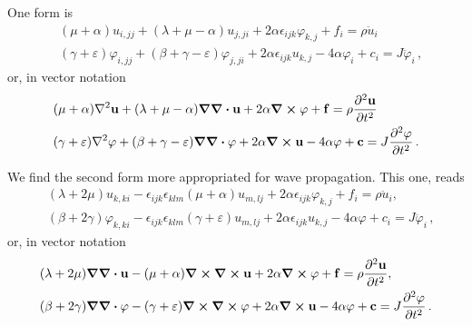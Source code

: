 \documentclass[12pt]{article}
\begin{document}
One form is
\begin{subequations}
  \begin{align}
    & (\mu + \alpha) u_{i, jj} + (\lambda + \mu - \alpha) u_{j,ji} + 2\alpha \epsilon_{ijk}\varphi_{k,j} + f_i = \rho \ddot{u}_i\, \\
    & (\gamma + \varepsilon) \varphi_{i, jj} + (\beta + \gamma - \varepsilon) \varphi_{j,ji} + 2\alpha \epsilon_{ijk}u_{k,j} - 4\alpha \varphi_i  + c_i = J \ddot{\varphi}_i\, ,
  \end{align}
\end{subequations}
or, in vector notation
\begin{align*}
    & (\mu + \alpha)\laplacian{\vb{u}} + (\lambda + \mu - \alpha) \grad\div\vb{u} + 2\alpha \curl\vb{\varphi} + \vb{f} = \rho \pdv[2]{\vb{u}}{t}\, \\
    & (\gamma + \varepsilon) \laplacian\vb{\varphi} + (\beta + \gamma - \varepsilon) \grad\div\vb{\varphi} + 2\alpha \curl\vb{u} - 4\alpha \vb{\varphi}  + \vb{c} = J \pdv[2]{\varphi}{t}\, .
\end{align*}

We find the second form more appropriated for wave propagation. This one, reads
\begin{subequations}
  \begin{align}
    & (\lambda + 2\mu) u_{k, ki} - \epsilon_{ijk} \epsilon_{klm} (\mu + \alpha) u_{m,lj}+ 2\alpha \epsilon_{ijk} \varphi_{k,j} + f_i = \rho \ddot{u}_i, \\
    & (\beta + 2\gamma) \varphi_{k, ki} - \epsilon_{ijk} \epsilon_{klm} (\gamma + \varepsilon) u_{m,lj}+ 2\alpha \epsilon_{ijk} u_{k,j} - 4\alpha\varphi + c_i = J \ddot{\varphi}_i\, ,
  \end{align}
\end{subequations}
or, in vector notation
\begin{subequations}\label{eq:disp_vector}
  \begin{align}
    & (\lambda + 2\mu) \grad\div\vb{u} - (\mu + \alpha)\curl\curl\vb{u} + 2\alpha \curl\vb{\varphi} + \vb{f} = \rho \pdv[2]{\vb{u}}{t}, \\
    & (\beta + 2\gamma) \grad\div\vb{\varphi} - (\gamma + \varepsilon) \curl\curl\vb{\varphi} +  2\alpha \curl\vb{u} - 4\alpha\vb{\varphi} + \vb{c} = J \pdv[2]{\vb{\varphi}}{t}\, .
  \end{align}
\end{subequations}
\end{document}
